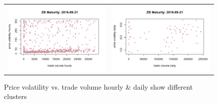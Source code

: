 \documentclass[12pt]{article}
\begin{document}
\begin{figure}[H]
	\begin{center}
		\begin{tabular}{ll}
			\includegraphics[width=8cm]{ZB2016-09-21hourly.png} &
			\includegraphics[width=8cm]{ZB2016-09-21daily.png} \\
		\end{tabular}
	\end{center}
	\caption{Price volatility vs. trade volume hourly \& daily show different clusters}
	\label{fig: 15}
\end{figure}
\end{document}
